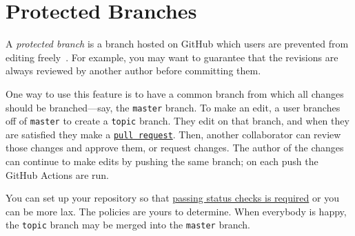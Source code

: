 \section{Protected Branches}\label{sec:protected branches}

A \emph{protected branch} is a branch hosted on GitHub which users are prevented from editing freely~\cite{protected-branches}.
For example, you may want to guarantee that the revisions are always reviewed by another author before committing them.

One way to use this feature is to have a common branch from which all changes should be branched---say, the \texttt{master} branch.
To make an edit, a user branches off of \texttt{master} to create a \texttt{topic} branch.
They edit on that branch, and when they are satisfied they make a \href{https://docs.github.com/en/free-pro-team@latest/github/collaborating-with-issues-and-pull-requests/about-pull-requests}{\texttt{pull request}}.
Then, another collaborator can review those changes and approve them, or request changes.
The author of the changes can continue to make edits by pushing the same branch; on each push the GitHub Actions are run.

You can set up your repository so that \href{https://docs.github.com/en/free-pro-team@latest/github/administering-a-repository/about-required-status-checks}{passing status checks is required} or you can be more lax.
The policies are yours to determine.
When everybody is happy, the \texttt{topic} branch may be merged into the \texttt{master} branch.
